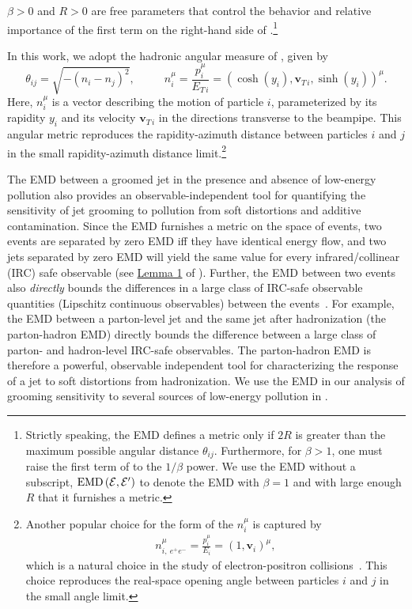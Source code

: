 %
\(\beta > 0\) and \(R > 0\) are free parameters that control the behavior and relative importance of the first term on the right-hand side of .\footnote{
Strictly speaking, the EMD defines a metric only if \(2 R\) is greater than the maximum possible angular distance \(\theta_{ij}\).
%
Furthermore, for \(\beta > 1\), one must raise the first term of  to the \(1/\beta\) power.
%
We use the EMD without a subscript, \(
{\rm EMD}\left(\mathcal{E}, \mathcal{E}'\right)
\) to denote the EMD with \(\beta = 1\) and with large enough \(R\) that it furnishes a metric.
}


In this work, we adopt the hadronic angular measure of , given by
\begin{equation}
    \theta_{ij} = \sqrt{-(n_i - n_j)^2}
    ,
    ~~~~~~
    ~~~~~~
    n_{i}^\mu = \frac{p_i^\mu}{E_{T\,i}} = (\cosh(y_i), \textbf{v}_{T\,i}, \sinh(y_i))^\mu
    .
    \label{eqn:hadronic_metric}
\end{equation}
Here, \(n_i^\mu\) is a vector describing the motion of particle \(i\), parameterized by its rapidity \(y_i\) and its velocity \(\textbf{v}_{T\, i}\) in the directions transverse to the beampipe.
%
This angular metric reproduces the rapidity-azimuth distance between particles \(i\) and \(j\) in the small rapidity-azimuth distance limit.\footnote{
Another popular choice for the form of the \(n_i^\mu\) is captured by
\begin{align}
    \label{eqn:ee_metric}
    n_{i,~{e^+e^-}}^\mu = \frac{p_i^\mu}{E_i} = (1, \textbf{v}_i)^\mu
    ,
\end{align}
which is a natural choice in the study of electron-positron collisions~\cite{Komiske:2020qhg}.
%
This choice reproduces the real-space opening angle between particles \(i\) and \(j\) in the small angle limit.
}

The EMD between a groomed jet in the presence and absence of low-energy pollution also provides an observable-independent tool for quantifying the sensitivity of jet grooming to pollution from soft distortions and additive contamination.
%
Since the EMD furnishes a metric on the space of events, two events are separated by zero EMD iff they have identical energy flow, and two jets separated by zero EMD will yield the same value for every infrared/collinear (IRC) safe observable (see \href{https://arxiv.org/pdf/2004.04159.pdf#page=11\&zoom=100,0,650}{Lemma 1} of ).
%
Further, the EMD between two events also \textit{directly} bounds the differences in a large class of IRC-safe observable quantities (Lipschitz continuous observables) between the events~\cite{Komiske:2019fks}.
%
For example, the EMD between a parton-level jet and the same jet after hadronization (the parton-hadron EMD) directly bounds the difference between a large class of parton- and hadron-level IRC-safe observables.
%
The parton-hadron EMD is therefore a powerful, observable independent tool for characterizing the response of a jet to soft distortions from hadronization.
%
We use the EMD in our analysis of grooming sensitivity to several sources of low-energy pollution in .


